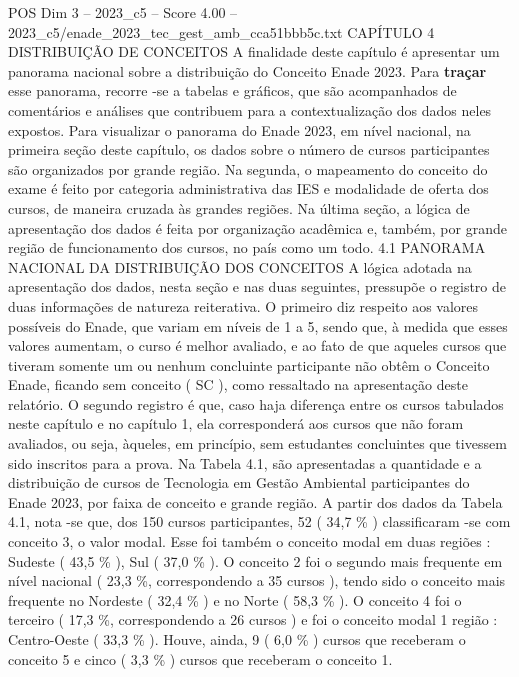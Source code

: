 \begin{textsample}{POS Dim 3 – 2023\_c5 – Score 4.00 – 2023\_c5/enade\_2023\_tec\_gest\_amb\_cca51bbb5c.txt}  \label{ex:f3_pos_052}
CAPÍTULO 4 DISTRIBUIÇÃO DE CONCEITOS A finalidade deste capítulo é apresentar um panorama nacional sobre a distribuição do Conceito Enade 2023.
Para \textbf{traçar} esse panorama, recorre -se a tabelas e gráficos, que são acompanhados de comentários e análises que contribuem para a contextualização dos dados neles expostos.
Para visualizar o panorama do Enade 2023, em nível nacional, na primeira seção deste capítulo, os dados sobre o número de cursos participantes são organizados por grande região.
Na segunda, o mapeamento do conceito do exame é feito por categoria administrativa das IES e modalidade de oferta dos cursos, de maneira cruzada às grandes regiões.
Na última seção, a lógica de apresentação dos dados é feita por organização acadêmica e, também, por grande região de funcionamento dos cursos, no país como um todo. 4.1 PANORAMA NACIONAL DA DISTRIBUIÇÃO DOS CONCEITOS A lógica adotada na apresentação dos dados, nesta seção e nas duas seguintes, pressupõe o registro de duas informações de natureza reiterativa.
O primeiro diz respeito aos valores possíveis do Enade, que variam em níveis de 1 a 5, sendo que, à medida que esses valores aumentam, o curso é melhor avaliado, e ao fato de que aqueles cursos que tiveram somente um ou nenhum concluinte participante não obtêm o Conceito Enade, ficando sem conceito ( SC ), como ressaltado na apresentação deste relatório.
O segundo registro é que, caso haja diferença entre os cursos tabulados neste capítulo e no capítulo 1, ela corresponderá aos cursos que não foram avaliados, ou seja, àqueles, em princípio, sem estudantes concluintes que tivessem sido inscritos para a prova.
Na Tabela 4.1, são apresentadas a quantidade e a distribuição de cursos de Tecnologia em Gestão Ambiental participantes do Enade 2023, por faixa de conceito e grande região.
A partir dos dados da Tabela 4.1, nota -se que, dos 150 cursos participantes, 52 ( 34,7 \% ) classificaram -se com conceito 3, o valor modal.
Esse foi também o conceito modal em duas regiões : Sudeste ( 43,5 \% ), Sul ( 37,0 \% ).
O conceito 2 foi o segundo mais frequente em nível nacional ( 23,3 \%, correspondendo a 35 cursos ), tendo sido o conceito mais frequente no Nordeste ( 32,4 \% ) e no Norte ( 58,3 \% ).
O conceito 4 foi o terceiro ( 17,3 \%, correspondendo a 26 cursos ) e foi o conceito modal 1 região : Centro-Oeste ( 33,3 \% ).
Houve, ainda, 9 ( 6,0 \% ) cursos que receberam o conceito 5 e cinco ( 3,3 \% ) cursos que receberam o conceito 1.

\end{textsample}
